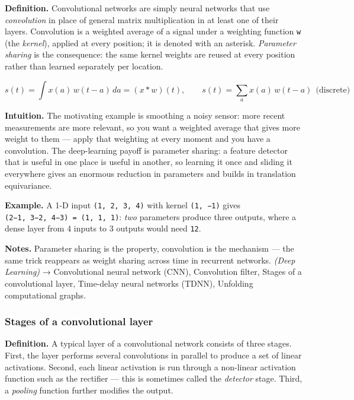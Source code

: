 \documentclass[
  10pt,
  letterpaper,
  onecolumn]{article}
\begin{document}
\textbf{Definition.} Convolutional networks are simply neural networks
that use \emph{convolution} in place of general matrix multiplication in
at least one of their layers. Convolution is a weighted average of a
signal under a weighting function \texttt{w} (the \emph{kernel}),
applied at every position; it is denoted with an asterisk.
\emph{Parameter sharing} is the consequence: the same kernel weights are
reused at every position rather than learned separately per location.

\begin{equation*}
s(t)=\int x(a)\,w(t-a)\,da=(x*w)(t),
\qquad
s(t)=\sum_{a}x(a)\,w(t-a)\ \ \text{(discrete)}
\end{equation*}

\textbf{Intuition.} The motivating example is smoothing a noisy sensor:
more recent measurements are more relevant, so you want a weighted
average that gives more weight to them --- apply that weighting at every
moment and you have a convolution. The deep-learning payoff is parameter
sharing: a feature detector that is useful in one place is useful in
another, so learning it once and sliding it everywhere gives an enormous
reduction in parameters and builds in translation equivariance.

\textbf{Example.} A 1-D input \texttt{(1,\ 2,\ 3,\ 4)} with kernel
\texttt{(1,\ −1)} gives \texttt{(2−1,\ 3−2,\ 4−3)\ =\ (1,\ 1,\ 1)}:
\emph{two} parameters produce three outputs, where a dense layer from
4 inputs to 3 outputs would need \texttt{12}.

\textbf{Notes.} Parameter sharing is the property, convolution is the
mechanism --- the same trick reappears as weight sharing across time in
recurrent networks. \emph{(Deep Learning)} → Convolutional neural
network (CNN), Convolution filter, Stages of a convolutional layer,
Time-delay neural networks (TDNN), Unfolding computational graphs.

\hypertarget{stages-of-a-convolutional-layer}{%
\subsubsection{Stages of a convolutional
layer}\label{stages-of-a-convolutional-layer}}

\textbf{Definition.} A typical layer of a convolutional network consists
of three stages. First, the layer performs several convolutions in
parallel to produce a set of linear activations. Second, each linear
activation is run through a non-linear activation function such as the
rectifier --- this is sometimes called the \emph{detector} stage. Third,
a \emph{pooling} function further modifies the output.
\end{document}
